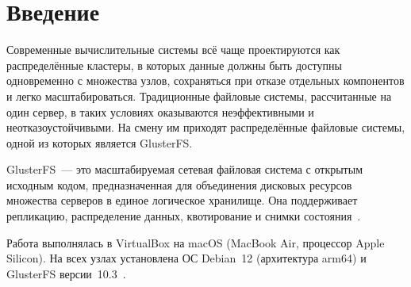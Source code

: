 \section*{Введение}

Современные вычислительные системы всё чаще проектируются как распределённые кластеры, в которых данные должны быть доступны одновременно с множества узлов, сохраняться при отказе отдельных компонентов и легко масштабироваться. Традиционные файловые системы, рассчитанные на один сервер, в таких условиях оказываются неэффективными и неотказоустойчивыми. На смену им приходят распределённые файловые системы, одной из которых является GlusterFS.

GlusterFS~--- это масштабируемая сетевая файловая система с открытым исходным кодом, предназначенная для объединения дисковых ресурсов множества серверов в единое логическое хранилище. Она поддерживает репликацию, распределение данных, квотирование и снимки состояния~\cite{gluster-volumes,gluster-quota,gluster-snapshots}.

Работа выполнялась в VirtualBox на macOS (MacBook Air, процессор Apple Silicon). На всех узлах установлена ОС Debian~12 (архитектура arm64) и GlusterFS версии~10.3~\cite{gluster-103}.
